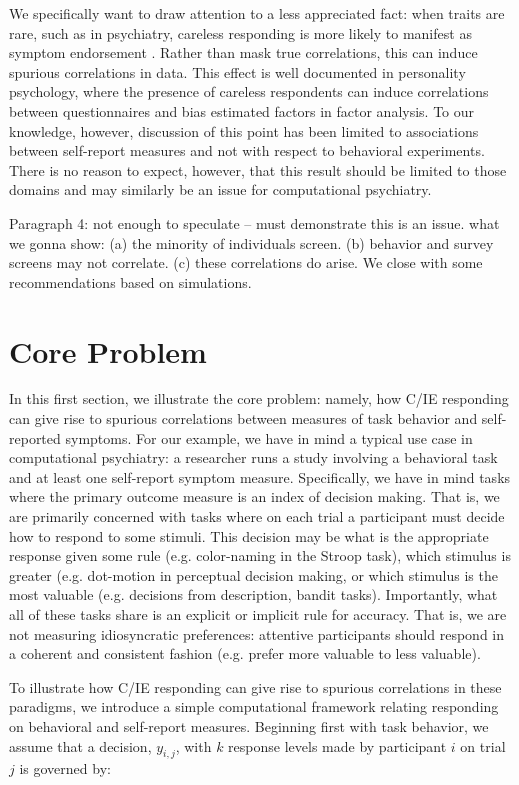 \documentclass[a4paper,notitlepage,12pt]{article}
\begin{document}
We specifically want to draw attention to a less appreciated fact: when traits are rare, such as in psychiatry, careless responding is more likely to manifest as symptom endorsement \cite{chandler2020participant, ophir2020turker}. Rather than mask true correlations, this can induce spurious correlations in data. This effect is well documented in personality psychology, where the presence of careless respondents can induce correlations between questionnaires and bias estimated factors in factor analysis. To our knowledge, however, discussion of this point has been limited to associations between self-report measures and not with respect to behavioral experiments. There is no reason to expect, however, that this result should be limited to those domains and may similarly be an issue for computational psychiatry.

Paragraph 4: not enough to speculate -- must demonstrate this is an issue. what we gonna show: (a) the minority of individuals screen. (b) behavior and survey screens may not correlate. (c) these correlations do arise. We close with some recommendations based on simulations. 

\section{Core Problem}

In this first section, we illustrate the core problem: namely, how C/IE responding can give rise to spurious correlations between measures of task behavior and self-reported symptoms. For our example, we have in mind a typical use case in computational psychiatry: a researcher runs a study involving a behavioral task and at least one self-report symptom measure. Specifically, we have in mind tasks where the primary outcome measure is an index of decision making. That is, we are primarily concerned with tasks where on each trial a participant must decide how to respond to some stimuli. This decision may be what is the appropriate response given some rule (e.g. color-naming in the Stroop task), which stimulus is greater (e.g. dot-motion in perceptual decision making, or which stimulus is the most valuable (e.g. decisions from description, bandit tasks). Importantly, what all of these tasks share is an explicit or implicit rule for accuracy. That is, we are not measuring idiosyncratic preferences: attentive participants should respond in a coherent and consistent fashion (e.g. prefer more valuable to less valuable).

To illustrate how C/IE responding can give rise to spurious correlations in these paradigms, we introduce a simple computational framework relating responding on behavioral and self-report measures. Beginning first with task behavior, we assume that a decision, $y_{i,j}$, with $k$ response levels made by participant $i$ on trial $j$ is governed by:
\end{document}
